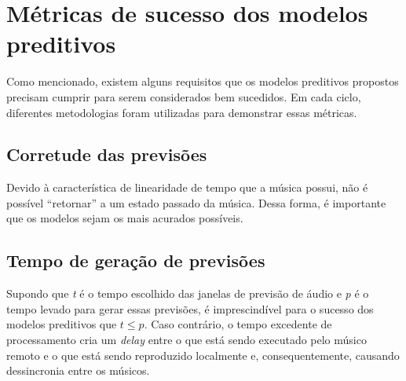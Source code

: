 \section{Métricas de sucesso dos modelos preditivos}

Como mencionado, existem alguns requisitos que os modelos preditivos propostos precisam cumprir para serem considerados bem sucedidos. Em cada ciclo, diferentes metodologias foram utilizadas para demonstrar essas métricas.

\subsection{Corretude das previsões}

Devido à característica de linearidade de tempo que a música possui, não é possível ``retornar'' a um estado passado da música. Dessa forma, é importante que os modelos sejam os mais acurados possíveis.

\subsection{Tempo de geração de previsões}

Supondo que \textit{t} é o tempo escolhido das janelas de previsão de áudio e \textit{p} é o tempo levado para gerar essas previsões, é imprescindível para o sucesso dos modelos preditivos que $t \leq p $. Caso contrário, o tempo excedente de processamento cria um \textit{delay} entre o que está sendo executado pelo músico remoto e o que está sendo reproduzido localmente e, consequentemente, causando dessincronia entre os músicos.
